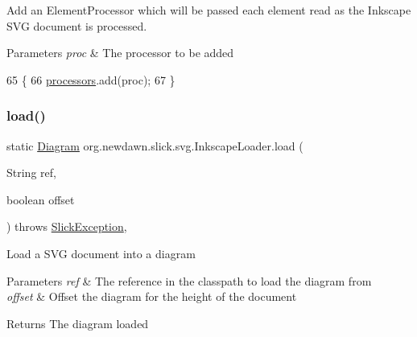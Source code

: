 Add an {\ttfamily Element\+Processor} which will be passed each element read as the Inkscape S\+VG document is processed.


\begin{DoxyParams}{Parameters}
{\em proc} & The processor to be added \\
\hline
\end{DoxyParams}

\begin{DoxyCode}
65                                                                   \{
66         \mbox{\hyperlink{classorg_1_1newdawn_1_1slick_1_1svg_1_1_inkscape_loader_a7ea6c8ad87a772c53ee88c0e3a9e9146}{processors}}.add(proc);
67     \}
\end{DoxyCode}
\mbox{\label{classorg_1_1newdawn_1_1slick_1_1svg_1_1_inkscape_loader_a740ecc54efa6c6f4794f966ee42585cf}} 
\subsubsection{\texorpdfstring{load()}{load()}\hspace{0.1cm}{\footnotesize\ttfamily [1/3]}}
{\footnotesize\ttfamily static \mbox{\hyperlink{classorg_1_1newdawn_1_1slick_1_1svg_1_1_diagram}{Diagram}} org.\+newdawn.\+slick.\+svg.\+Inkscape\+Loader.\+load (\begin{DoxyParamCaption}\item[{String}]{ref,  }\item[{boolean}]{offset }\end{DoxyParamCaption}) throws \mbox{\hyperlink{classorg_1_1newdawn_1_1slick_1_1_slick_exception}{Slick\+Exception}}\hspace{0.3cm}{\ttfamily [inline]}, {\ttfamily [static]}}

Load a S\+VG document into a diagram


\begin{DoxyParams}{Parameters}
{\em ref} & The reference in the classpath to load the diagram from \\
\hline
{\em offset} & Offset the diagram for the height of the document \\
\hline
\end{DoxyParams}
\begin{DoxyReturn}{Returns}
The diagram loaded 
\end{DoxyReturn}

